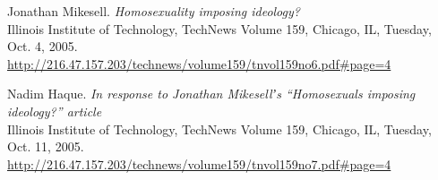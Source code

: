\documentclass[a4paper,12pt]{article}
\begin{document}
\medskip

\begin{thebibliography}{9}

Jonathan Mikesell.
\textit{Homosexuality imposing ideology?} \\
Illinois Institute of Technology, TechNews Volume 159, Chicago, IL, Tuesday, Oct. 4, 2005.
\url{http://216.47.157.203/technews/volume159/tnvol159no6.pdf\#page=4}

Nadim Haque.
\textit{In response to Jonathan Mikesellʼs “Homosexuals imposing ideology?” article} \\
Illinois Institute of Technology, TechNews Volume 159, Chicago, IL, Tuesday, Oct. 11, 2005.
\url{http://216.47.157.203/technews/volume159/tnvol159no7.pdf\#page=4}


\end{thebibliography}


\newpage

\end{document}
